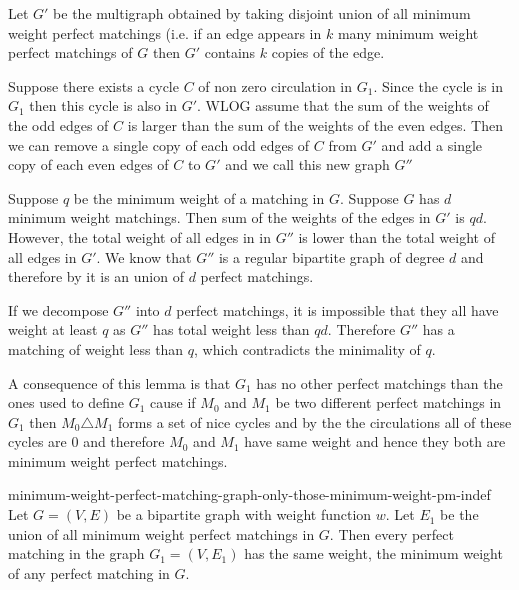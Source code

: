 \begin{alternate-proof}
Let $G'$ be the multigraph obtained by taking disjoint union of all minimum weight perfect matchings (i.e. if an edge appears in $k$ many minimum weight perfect matchings of $G$ then $G'$ contains  $k$ copies of the edge.


Suppose there exists a cycle $C$ of non zero circulation in $G_1$. Since the cycle is in $G_1$ then this cycle is also in $G'$. WLOG  assume that the sum of the weights of the odd edges of $C$ is larger than the sum of the weights of the even edges. Then we can remove a single copy of each odd edges of $C$ from $G'$ and add a single copy of each even edges of $C$ to $G'$ and we call this new graph $G''$

Suppose $q$ be the minimum weight of a matching in $G$. Suppose $G$ has $d$ minimum weight matchings. Then sum of the weights of the edges in $G'$ is $qd$.	However, the total weight of all edges in in $G''$ is lower than the total weight of all edges in $G'$. We know  that $G''$ is a regular bipartite graph of degree $d$ and therefore by  it is an union of $d$ perfect matchings.

If we decompose $G''$ into $d$ perfect matchings, it is impossible that they all have weight at least $q$ as $G''$ has total weight less than $qd$. Therefore $G''$ has a matching of weight less than $q$, which contradicts the minimality of $q$.
\end{alternate-proof}
A consequence of this lemma is that $G_1$ has no other perfect matchings than the ones used to define $G_1$ cause if $M_0$ and $M_1$ be two different perfect matchings in $G_1$ then $M_0\triangle M_1$ forms a set of nice cycles and by the  the circulations all of these cycles are 0 and therefore $M_0$ and $M_1$ have same weight and hence they both are minimum weight perfect matchings.
\begin{corolary}{}{minimum-weight-perfect-matching-graph-only-those-minimum-weight-pm-indef}
	Let $G=(V,E)$ be a bipartite graph with weight function $w$. Let $E_1$ be the union of all minimum weight perfect matchings in $G$. Then every perfect matching in the graph $G_1=(V,E_1)$ has the same weight, the minimum weight of any perfect matching in $G$.
\end{corolary}
